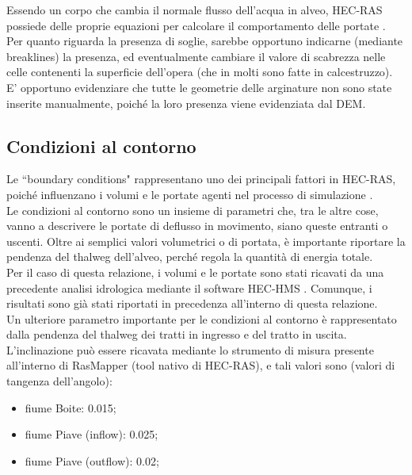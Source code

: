 Essendo un corpo che cambia il normale flusso dell'acqua in alveo, HEC-RAS possiede delle proprie equazioni per calcolare il comportamento delle portate \cite{modeling_bridges}.\\
Per quanto riguarda la presenza di soglie, sarebbe opportuno indicarne (mediante breaklines) la presenza, ed eventualmente cambiare il valore di scabrezza nelle celle contenenti la superficie dell'opera (che in molti sono fatte in calcestruzzo).\\
E' opportuno evidenziare che tutte le geometrie delle arginature non sono state inserite manualmente, poiché la loro presenza viene evidenziata dal DEM.

\subsection{Condizioni al contorno}
Le ``boundary conditions" rappresentano uno dei principali fattori in HEC-RAS, poiché influenzano i volumi e le portate agenti nel processo di simulazione \cite{boundary_conditions}.\\
Le condizioni al contorno sono un insieme di parametri che, tra le altre cose, vanno a descrivere le portate di deflusso in movimento, siano queste entranti o uscenti. Oltre ai semplici valori volumetrici o di portata, è importante riportare la pendenza del thalweg dell'alveo, perché regola la quantità di energia totale.\\
Per il caso di questa relazione, i volumi e le portate sono stati ricavati da una precedente analisi idrologica mediante il software HEC-HMS \cite{progetto_hms}. Comunque, i risultati sono già stati riportati in precedenza all'interno di questa relazione.\\
Un ulteriore parametro importante per le condizioni al contorno è rappresentato dalla pendenza del thalweg dei tratti in ingresso e del tratto in uscita.\\
L'inclinazione può essere ricavata mediante lo strumento di misura presente all'interno di RasMapper (tool nativo di HEC-RAS), e tali valori sono (valori di tangenza dell'angolo):
\begin{itemize}
    \item fiume Boite: 0.015;
    \item fiume Piave (inflow): 0.025;
    \item fiume Piave (outflow): 0.02;
\end{itemize}

